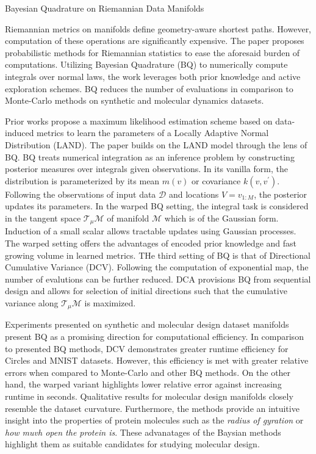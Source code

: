 \documentclass[12pt,letterpaper]{article}
\begin{document}
\begin{center}
  \large{Bayesian Quadrature on Riemannian Data Manifolds}
\end{center}

Riemannian metrics on manifolds define geometry-aware shortest paths. However, computation of these operations are significantly expensive. The paper proposes probabilistic methods for Riemannian statistics to ease the aforesaid burden of computations. Utilizing Bayesian Quadrature (BQ) to numerically compute integrals over normal laws, the work leverages both prior knowledge and active exploration schemes. BQ reduces the number of evaluations in comparison to Monte-Carlo methods on synthetic and molecular dynamics datasets.

Prior works propose a maximum likelihood estimation scheme based on data-induced metrics to learn the parameters of a Locally Adaptive Normal Distribution (LAND). The paper builds on the LAND model through the lens of BQ. BQ treats numerical integration as an inference problem by constructing posterior measures over integrals given observations. In its vanilla form, the distribution is parameterized by its mean $m(v)$ or covariance $k(v,v^{\prime})$. Following the observations of input data $\mathcal{D}$ and locations $V=v_{1:M}$, the posterior updates its parameters. In the warped BQ setting, the integral task is considered in the tangent space $\mathcal{T}_{\mu}\mathcal{M}$ of manifold $\mathcal{M}$ which is of the Gaussian form. Induction of a small scalar allows tractable updates using Gaussian processes. The warped setting offers the advantages of encoded prior knowledge and fast growing volume in learned metrics. THe third setting of BQ is that of Directional Cumulative Variance (DCV). Following the computation of exponential map, the number of evalutions can be further reduced. DCA provisions BQ from sequential design and allows for selection of initial directions such that the cumulative variance along $\mathcal{T}_{\mu}\mathcal{M}$ is maximized. 

Experiments presented on synthetic and molecular design dataset manifolds present BQ as a promising direction for computational efficiency. In comparison to presented BQ methods, DCV demonstrates greater runtime efficiency for Circles and MNIST datasets. However, this efficiency is met with greater relative errors when compared to Monte-Carlo and other BQ methods. On the other hand, the warped variant highlights lower relative error against increasing runtime in seconds. Qualitative results for molecular design manifolds closely resemble the dataset curvature. Furthermore, the methods provide an intuitive insight into the properties of protein molecules such as the \textit{radius of gyration} or \textit{how muvh open the protein is}. These advanatages of the Baysian methods highlight them as suitable candidates for studying molecular design. 
\end{document}
